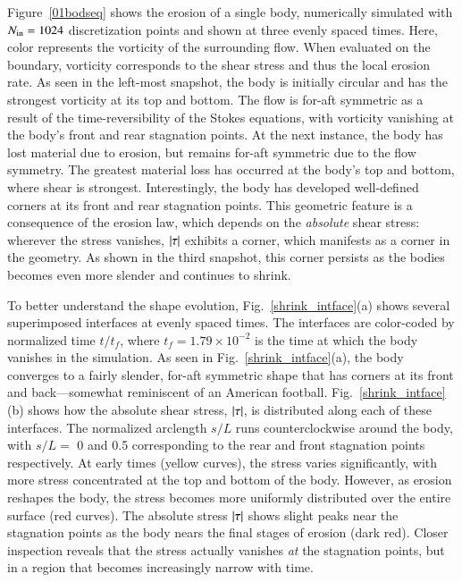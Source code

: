 \documentclass[preprint, 10pt]{elsarticle}
\begin{document}
Figure~\ref{01bodseq} shows the erosion of a single body, numerically
simulated with $N_{\mathrm{in}} = 1024$ discretization points and shown at three
evenly spaced times. Here, color represents the vorticity of the
surrounding flow. When evaluated on the boundary, vorticity corresponds
to the shear stress and thus the local erosion rate. As seen in the
left-most snapshot, the body is initially circular and has the strongest
vorticity at its top and bottom. The flow is for-aft symmetric as a result of the time-reversibility of the Stokes equations, with vorticity vanishing at the body's front and rear stagnation points. 
At the next instance, the body has lost material due to erosion, but remains for-aft symmetric due to the flow symmetry. The greatest material loss has occurred at the body's top and bottom, where shear is strongest. Interestingly, the body has developed well-defined corners at its front and rear stagnation points. This geometric feature is a consequence of the erosion law, which depends on the {\em absolute} shear stress: wherever the stress vanishes, $\lvert \tau \rvert$ exhibits a corner, which manifests as a corner in the geometry. As shown in the third snapshot, this corner persists as the bodies becomes even more slender and continues to shrink.

To better understand the shape evolution, Fig.~\ref{shrink_intface}(a) shows several superimposed interfaces at evenly spaced times. The interfaces are color-coded by normalized time $t/t_f$, where $t_f = 1.79 \times 10^{-2}$ is the time at which the body vanishes in the simulation. As seen in Fig.~\ref{shrink_intface}(a), the body converges to a fairly slender, for-aft symmetric shape that has corners at its front and back---somewhat reminiscent of an American football.
Fig.~\ref{shrink_intface}(b) shows how the absolute shear stress,
$\lvert \tau \rvert$, is distributed along each of these interfaces. The normalized
arclength $s/L$ runs counterclockwise around the body, with $s/L = $ 0
and 0.5 corresponding to the rear and front stagnation points
respectively. At early times (yellow curves), the stress varies
significantly, with more stress concentrated at the top and bottom of
the body. However, as erosion reshapes the body, the stress becomes more
uniformly distributed over the entire surface (red curves). The absolute
stress $\lvert \tau \rvert$ shows slight peaks near the stagnation points as the body nears the final stages of erosion (dark red). Closer inspection reveals that the stress actually vanishes {\em at} the stagnation points, but in a region that becomes increasingly narrow with time.
\end{document}
